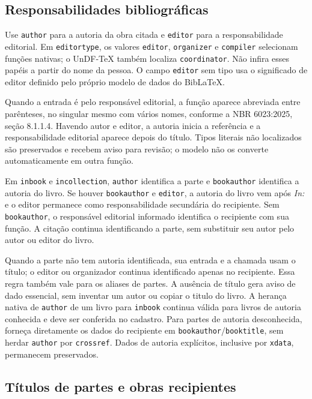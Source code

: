 \subsection*{Responsabilidades bibliográficas}

Use \texttt{author} para a autoria da obra citada e \texttt{editor} para
a responsabilidade editorial. Em \texttt{editortype}, os valores
\texttt{editor}, \texttt{organizer} e \texttt{compiler} selecionam funções
nativas; o UnDF-TeX também localiza \texttt{coordinator}. Não infira esses
papéis a partir do nome da pessoa. O campo \texttt{editor} sem tipo usa o
significado de editor definido pelo próprio modelo de dados do BibLaTeX.

Quando a entrada é pelo responsável editorial, a função aparece abreviada
entre parênteses, no singular mesmo com vários nomes, conforme a NBR
6023:2025, seção 8.1.1.4. Havendo autor e editor, a autoria inicia a
referência e a responsabilidade editorial aparece depois do título.
Tipos literais não localizados são preservados e recebem aviso para revisão;
o modelo não os converte automaticamente em outra função.

Em \texttt{inbook} e \texttt{incollection}, \texttt{author} identifica a
parte e \texttt{bookauthor} identifica a autoria do livro. Se houver
\texttt{bookauthor} e \texttt{editor}, a autoria do livro vem após
\emph{In:} e o editor permanece como responsabilidade secundária do
recipiente. Sem \texttt{bookauthor}, o responsável editorial informado
identifica o recipiente com sua função. A citação continua identificando
a parte, sem substituir seu autor pelo autor ou editor do livro.

Quando a parte não tem autoria identificada, sua entrada e a chamada usam
o título; o editor ou organizador continua identificado apenas no recipiente.
Essa regra também vale para os aliases de partes. A ausência de título gera
aviso de dado essencial, sem inventar um autor ou copiar o titulo do livro.
A herança nativa de \texttt{author} de um livro para \texttt{inbook} continua
válida para livros de autoria conhecida e deve ser conferida no cadastro.
Para partes de autoria desconhecida, forneça diretamente os dados do recipiente
em \texttt{bookauthor}/\texttt{booktitle}, sem herdar \texttt{author}
por \texttt{crossref}. Dados de autoria explícitos, inclusive por
\texttt{xdata}, permanecem preservados.

\subsection*{Títulos de partes e obras recipientes}

